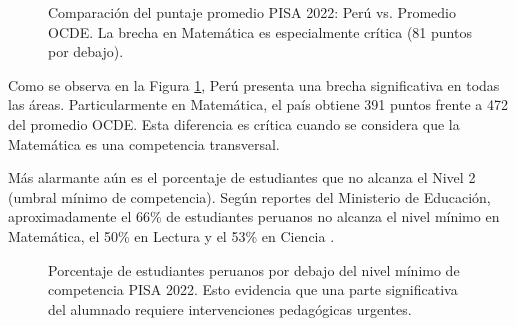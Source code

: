 \documentclass[12pt]{article}
\begin{document}
\begin{figure}[H]
\centering
{}
\caption{Comparación del puntaje promedio PISA 2022: Perú vs. Promedio OCDE. La brecha en Matemática es especialmente crítica (81 puntos por debajo).}
\label{fig:pisa_puntajes}
\end{figure}

Como se observa en la Figura \ref{fig:pisa_puntajes}, Perú presenta una brecha significativa en todas las áreas. Particularmente en Matemática, el país obtiene 391 puntos frente a 472 del promedio OCDE. Esta diferencia es crítica cuando se considera que la Matemática es una competencia transversal.

Más alarmante aún es el porcentaje de estudiantes que no alcanza el Nivel 2 (umbral mínimo de competencia). Según reportes del Ministerio de Educación, aproximadamente el 66\% de estudiantes peruanos no alcanza el nivel mínimo en Matemática, el 50\% en Lectura y el 53\% en Ciencia \cite{MINEDUPISA2022}.

\begin{figure}[H]
\centering
{}
\caption{Porcentaje de estudiantes peruanos por debajo del nivel mínimo de competencia PISA 2022. Esto evidencia que una parte significativa del alumnado requiere intervenciones pedagógicas urgentes.}
\label{fig:pisa_bajo_nivel}
\end{figure}
\end{document}
